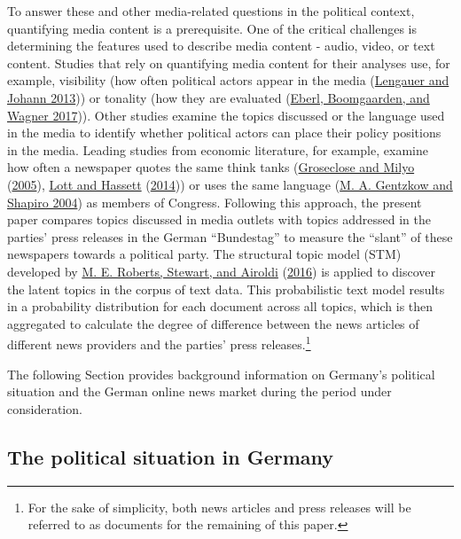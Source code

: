 \documentclass[
  12pt,
]{article}
\begin{document}
To answer these and other media-related questions in the political
context, quantifying media content is a prerequisite. One of the
critical challenges is determining the features used to describe media
content - audio, video, or text content. Studies that rely on
quantifying media content for their analyses use, for example,
visibility (how often political actors appear in the media
(\protect\hyperlink{ref-lengauer_candidate_2013}{Lengauer and Johann
2013})) or tonality (how they are evaluated
(\protect\hyperlink{ref-eberl_one_2017}{Eberl, Boomgaarden, and Wagner
2017})). Other studies examine the topics discussed or the language used
in the media to identify whether political actors can place their policy
positions in the media. Leading studies from economic literature, for
example, examine how often a newspaper quotes the same think tanks
(\protect\hyperlink{ref-groseclose_measure_2005}{Groseclose and Milyo}
(\protect\hyperlink{ref-groseclose_measure_2005}{2005}),
\protect\hyperlink{ref-lott_is_2014}{Lott and Hassett}
(\protect\hyperlink{ref-lott_is_2014}{2014})) or uses the same language
(\protect\hyperlink{ref-gentzkow_media_2004}{M. A. Gentzkow and Shapiro
2004}) as members of Congress. Following this approach, the present
paper compares topics discussed in media outlets with topics addressed
in the parties' press releases in the German ``Bundestag'' to measure
the ``slant'' of these newspapers towards a political party. The
structural topic model (STM) developed by
\protect\hyperlink{ref-roberts_model_2016}{M. E. Roberts, Stewart, and
Airoldi} (\protect\hyperlink{ref-roberts_model_2016}{2016}) is applied
to discover the latent topics in the corpus of text data. This
probabilistic text model results in a probability distribution for each
document across all topics, which is then aggregated to calculate the
degree of difference between the news articles of different news
providers and the parties' press releases.\footnote{For the sake of
  simplicity, both news articles and press releases will be referred to
  as documents for the remaining of this paper.}

The following Section provides background information on Germany's
political situation and the German online news market during the period
under consideration.

\hypertarget{the-political-situation-in-germany}{%
\subsection{The political situation in
Germany}\label{the-political-situation-in-germany}}
\end{document}
